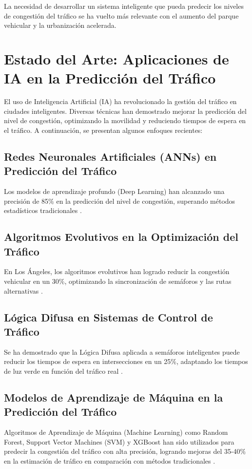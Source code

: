 \documentclass{svproc} %
\begin{document}
La necesidad de desarrollar un sistema inteligente que pueda predecir los niveles de
congestión del tráfico se ha vuelto más relevante con el aumento del parque vehicular y
la urbanización acelerada.

\section{Estado del Arte: Aplicaciones de IA en la Predicción del Tráfico}
El uso de Inteligencia Artificial (IA) ha revolucionado la gestión del tráfico en ciudades
inteligentes. Diversas técnicas han demostrado mejorar la predicción del nivel de
congestión, optimizando la movilidad y reduciendo tiempos de espera en el tráfico. A
continuación, se presentan algunos enfoques recientes:

\subsection{Redes Neuronales Artificiales (ANNs) en Predicción del Tráfico}
Los modelos de aprendizaje profundo (Deep Learning) han alcanzado una
precisión de 85\% en la predicción del nivel de congestión, superando métodos
estadísticos tradicionales \cite{Goenawan2024}.

\subsection{Algoritmos Evolutivos en la Optimización del Tráfico}
En Los Ángeles, los algoritmos evolutivos han logrado reducir la congestión
vehicular en un 30\%, optimizando la sincronización de semáforos y las rutas
alternativas \cite{SmartMobility2024}.

\subsection{Lógica Difusa en Sistemas de Control de Tráfico}
Se ha demostrado que la Lógica Difusa aplicada a semáforos inteligentes puede
reducir los tiempos de espera en intersecciones en un 25\%, adaptando los tiempos
de luz verde en función del tráfico real \cite{TransportationScience2024}.

\subsection{Modelos de Aprendizaje de Máquina en la Predicción del Tráfico}
Algoritmos de Aprendizaje de Máquina (Machine Learning) como Random Forest,
Support Vector Machines (SVM) y XGBoost han sido utilizados para predecir la
congestión del tráfico con alta precisión, logrando mejoras del 35-40\% en la
estimación de tráfico en comparación con métodos tradicionales \cite{Li2024}.
\end{document}
